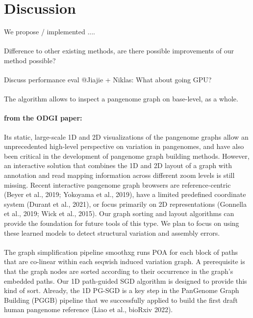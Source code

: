 \documentclass[11pt,hidelinks]{article}
\begin{document}
\section{Discussion}

We propose / implemented ....
\paragraph{}
Difference to other existing methods, are there possible improvements of our method possible?
\paragraph{}
Discuss performance eval
@Jiajie + Niklas: What about going GPU?
\paragraph{}
The algorithm allows to inspect a pangenome graph on base-level, as a whole.
\paragraph{from the ODGI paper:}
Its static, large-scale 1D and 2D visualizations of the pangenome graphs allow an unprecedented high-level perspective on variation in pangenomes, and have also been critical in the development of pangenome graph building methods.
However, an interactive solution that combines the 1D and 2D layout of a graph with annotation and read mapping information across different zoom levels is still missing.
Recent interactive pangenome graph browsers are reference-centric (Beyer et al., 2019; Yokoyama et al., 2019), have a limited predefined coordinate system (Durant et al., 2021), or focus primarily on 2D representations (Gonnella et al., 2019; Wick et al., 2015).
Our graph sorting and layout algorithms can provide the foundation for future tools of this type.
We plan to focus on using these learned models to detect structural variation and assembly errors.
\paragraph{}
The graph simplification pipeline smoothxg runs POA for each block of paths that are co-linear within each seqwish induced variation graph.
A prerequisite is that the graph nodes are sorted according to their occurrence in the graph's embedded paths.
Our 1D path-guided SGD algorithm is designed to provide this kind of sort.
Already, the 1D PG-SGD is a key step in the PanGenome Graph Building (PGGB) pipeline that we successfully applied to build the first draft human pangenome reference (Liao et al., bioRxiv 2022).
\end{document}
